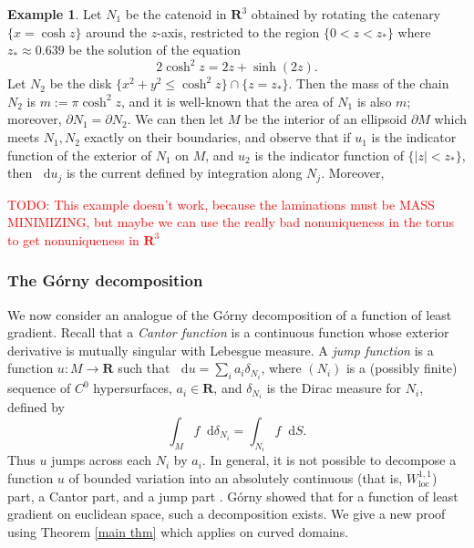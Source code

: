 \documentclass[reqno,11pt]{amsart}
\newcommand{\RR}{\mathbf{R}}
\newcommand*\dif{\mathop{}\!\mathrm{d}}
\newcommand{\dfn}[1]{\emph{#1}\index{#1}}
\newcommand{\loc}{\mathrm{loc}}
\theoremstyle{definition}
\newtheorem{example}[theorem]{Example}
\numberwithin{equation}{section}
\newcommand\todo[1]{\textcolor{red}{TODO: #1}}
\begin{document}
\begin{example}
Let $N_1$ be the catenoid in $\RR^3$ obtained by rotating the catenary $\{x = \cosh z\}$ around the $z$-axis, restricted to the region $\{0 < z < z_*\}$ where $z_* \approx 0.639$ be the solution of the equation
$$2 \cosh^2 z = 2z + \sinh(2z).$$
Let $N_2$ be the disk $\{x^2 + y^2 \leq \cosh^2 z\} \cap \{z = z_*\}$.
Then the mass of the chain $N_2$ is $m := \pi \cosh^2 z$, and it is well-known that the area of $N_1$ is also $m$; moreover, $\partial N_1 = \partial N_2$.
We can then let $M$ be the interior of an ellipsoid $\partial M$ which meets $N_1, N_2$ exactly on their boundaries, and observe that if $u_1$ is the indicator function of the exterior of $N_1$ on $M$, and $u_2$ is the indicator function of $\{|z| < z_*\}$, then $\dif u_j$ is the current defined by integration along $N_j$.
Moreover, 
\end{example}

\todo{This example doesn't work, because the laminations must be MASS MINIMIZING, but maybe we can use the really bad nonuniqueness in the torus to get nonuniqueness in $\RR^3$}

\subsubsection{The G\'orny decomposition}
We now consider an analogue of the G\'orny decomposition \cite[Theorem 1.2]{górny2017planar} of a function of least gradient.
Recall that a \dfn{Cantor function} is a continuous function whose exterior derivative is mutually singular with Lebesgue measure.
A \dfn{jump function} is a function $u: M \to \RR$ such that $\dif u = \sum_i a_i \delta_{N_i}$, where $(N_i)$ is a (possibly finite) sequence of $C^0$ hypersurfaces, $a_i \in \RR$, and $\delta_{N_i}$ is the Dirac measure for $N_i$, defined by
$$\int_M f \dif \delta_{N_i} = \int_{N_i} f \dif S.$$
Thus $u$ jumps across each $N_i$ by $a_i$.
In general, it is not possible to decompose a function $u$ of bounded variation into an absolutely continuous (that is, $W^{1, 1}_\loc$) part, a Cantor part, and a jump part \cite[Example 4.1]{Ambrosio2000FunctionsOB}.
G\'orny showed that for a function of least gradient on euclidean space, such a decomposition exists.
We give a new proof using Theorem \ref{main thm} which applies on curved domains.
\end{document}

